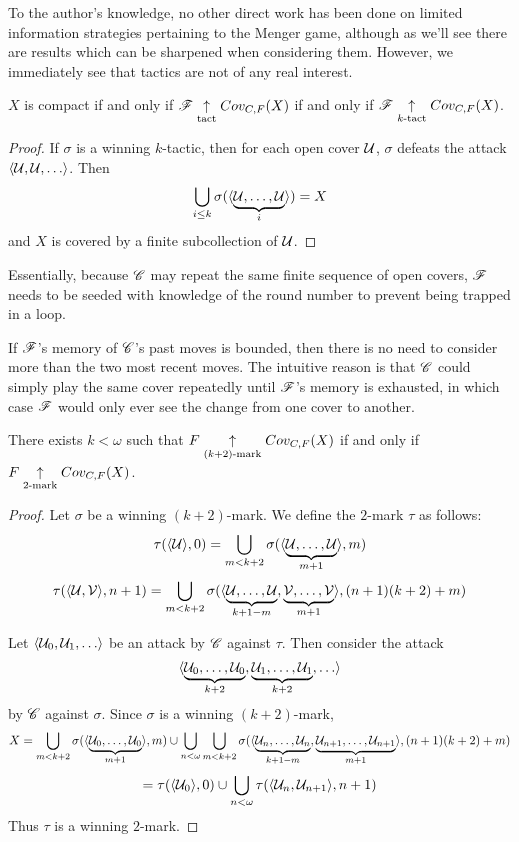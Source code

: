 To the author's knowledge, no other direct work has been done on limited
information strategies pertaining to the Menger game, although as we'll see
there are results which can be sharpened when considering them.
However, we immediately see that tactics are not of any real interest.

\begin{prop}
  $X$ is compact if and only if
  $\mathscr{F} \underset{\text{tact}}{\uparrow} Cov_{C,F}(X)$ if and only if
  $\mathscr{F} \underset{k\text{-tact}}{\uparrow} Cov_{C,F}(X)$.
\end{prop}

\begin{proof}
  If $\sigma$ is a winning $k$-tactic, then for each open cover $\mathcal{U}$,
  $\sigma$ defeats the attack $\<\mc U,\mc U,\dots\>$. Then
  \[
    \bigcup_{i\leq k} \sigma(\langle\underbrace{\mathcal{U},\dots,\mathcal{U}}_i\rangle) = X
  \]
  and $X$ is covered by a finite subcollection of $\mathcal{U}$.
\end{proof}

Essentially, because $\mathscr{C}$ may repeat the same finite sequence of open covers,
$\mathscr{F}$ needs to be seeded with knowledge of the round number to prevent being
trapped in a loop.

If $\mathscr{F}$'s memory of $\mathscr{C}$'s past moves is bounded, then
there is no need to consider more than the two most recent moves. The
intuitive reason is that $\mathscr{C}$ could simply play the same cover repeatedly
until $\mathscr{F}$'s memory is exhausted, in which case $\mathscr{F}$ would only ever
see the change from one cover to another.

\begin{thm}
  There exists $k<\omega$ such that $F \underset{(k+2)\text{-mark}}{\uparrow} Cov_{C,F}(X)$
  if and only if $F \underset{2\text{-mark}}{\uparrow} Cov_{C,F}(X)$.
\end{thm}

\begin{proof}
  Let $\sigma$ be a winning $(k+2)$-mark. We define the $2$-mark $\tau$ as
  follows:
    \[
      \tau(\langle\mathcal{U}\rangle,0)
        =
      \bigcup_{m<k+2}
        \sigma(\langle\underbrace{\mathcal{U},\dots,\mathcal{U}}_{m+1}\rangle,m)
    \]
    \[
      \tau(\langle\mathcal{U},\mathcal{V}\rangle,n+1)
        =
      \bigcup_{m<k+2}
        \sigma(\langle
          \underbrace{\mathcal{U},\dots,\mathcal{U}}_{k+1-m},
          \underbrace{\mathcal{V},\dots,\mathcal{V}}_{m+1}
        \rangle,(n+1)(k+2)+m)
    \]

  Let $\<\mc U_0,\mc U_1,\dots\>$ be an attack by $\mathscr{C}$ against $\tau$.
  Then consider the attack
    \[
      \<
        \underbrace{\mc U_0,\dots,\mc U_0}_{k+2},
        \underbrace{\mc U_1,\dots,\mc U_1}_{k+2},
        \dots
      \>
    \]
  by $\mathscr{C}$ against $\sigma$. Since $\sigma$ is a winning $(k+2)$-mark,
    \[
      X
        =
      \bigcup_{m<k+2}
        \sigma(\langle\underbrace{\mathcal{U}_0,\dots,\mathcal{U}_0}_{m+1}\rangle,m)
      \cup
      \bigcup_{n<\omega}
      \bigcup_{m<k+2}
        \sigma(\langle
          \underbrace{\mathcal{U}_n,\dots,\mathcal{U}_n}_{k+1-m},
          \underbrace{\mathcal{U}_{n+1},\dots,\mathcal{U}_{n+1}}_{m+1}
        \rangle,(n+1)(k+2)+m)
    \]
    \[
      =
      \tau(\langle\mathcal{U}_0\rangle,0)
      \cup
      \bigcup_{n<\omega}
      \tau(\langle\mathcal{U}_n,\mathcal{U}_{n+1}\rangle,n+1)
    \]
  Thus $\tau$ is a winning $2$-mark.
\end{proof}

